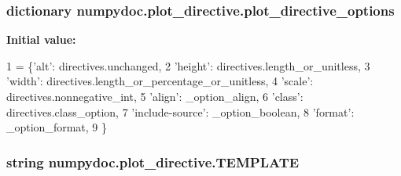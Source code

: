 \subsubsection[{plot\+\_\+directive\+\_\+options}]{\setlength{\rightskip}{0pt plus 5cm}dictionary numpydoc.\+plot\+\_\+directive.\+plot\+\_\+directive\+\_\+options}\label{namespacenumpydoc_1_1plot__directive_a6206bc6678f1dc01750dfab138d5c5a8}
{\bfseries Initial value\+:}
\begin{DoxyCode}
1 = \{\textcolor{stringliteral}{'alt'}: directives.unchanged,
2                           \textcolor{stringliteral}{'height'}: directives.length\_or\_unitless,
3                           \textcolor{stringliteral}{'width'}: directives.length\_or\_percentage\_or\_unitless,
4                           \textcolor{stringliteral}{'scale'}: directives.nonnegative\_int,
5                           \textcolor{stringliteral}{'align'}: \_option\_align,
6                           \textcolor{stringliteral}{'class'}: directives.class\_option,
7                           \textcolor{stringliteral}{'include-source'}: \_option\_boolean,
8                           \textcolor{stringliteral}{'format'}: \_option\_format,
9                           \}
\end{DoxyCode}
\hypertarget{namespacenumpydoc_1_1plot__directive_a3c421da98ea0efafc9a723bd1e00870b}{}
\subsubsection[{T\+E\+M\+P\+L\+A\+T\+E}]{\setlength{\rightskip}{0pt plus 5cm}string numpydoc.\+plot\+\_\+directive.\+T\+E\+M\+P\+L\+A\+T\+E}\label{namespacenumpydoc_1_1plot__directive_a3c421da98ea0efafc9a723bd1e00870b}
